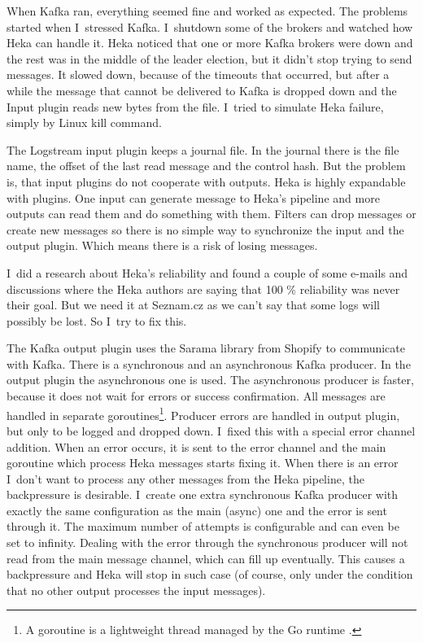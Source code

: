 When Kafka ran, everything seemed fine and worked as expected. The problems started when I~stressed Kafka. I~shutdown some of the brokers and watched how Heka can handle it. Heka noticed that one or more Kafka brokers were down and the rest was in the middle of the leader election, but it didn’t stop trying to send messages. It slowed down, because of the timeouts that occurred, but after a while the message that cannot be delivered to Kafka is dropped down and the Input plugin reads new bytes from the file. I~tried to simulate Heka failure, simply by Linux kill command.

The Logstream input plugin keeps a journal file. In the journal there is the file name, the offset of the last read message and the control hash. But the problem is, that input plugins do not cooperate with outputs. Heka is highly expandable with plugins. One input can generate message to Heka’s pipeline and more outputs can read them and do something with them. Filters can drop messages or create new messages so there is no simple way to synchronize the input and the output plugin. Which means there is a risk of losing messages.
 
I~did a research about Heka’s reliability and found a couple of some e-mails and discussions where the Heka authors are saying that 100 \% reliability was never their goal. But we need it at Seznam.cz as we can’t say that some logs will possibly be lost. So I~try to fix this.

The Kafka output plugin uses the Sarama library from Shopify \cite{shopify} to communicate with Kafka. There is a synchronous and an asynchronous Kafka producer. In the output plugin the asynchronous one is used. The asynchronous producer is faster, because it does not wait for errors or success confirmation. All messages are handled in separate goroutines\footnote{A goroutine is a lightweight thread managed by the Go runtime \cite{goroutine}.}. Producer errors are handled in output plugin, but only to be logged and dropped down. I~fixed this with a special error channel addition. When an error occurs, it is sent to the error channel and the main goroutine which process Heka messages starts fixing it. When there is an error I~don’t want to process any other messages from the Heka pipeline, the backpressure is desirable. I~create one extra synchronous Kafka producer with exactly the same configuration as the main (async) one and the error is sent through it. The maximum number of attempts is configurable and can even be set to infinity. Dealing with the error through the synchronous producer will not read from the main message channel, which can fill up eventually. This causes a backpressure and Heka will stop in such case (of course, only under the condition that no other output processes the input messages).

